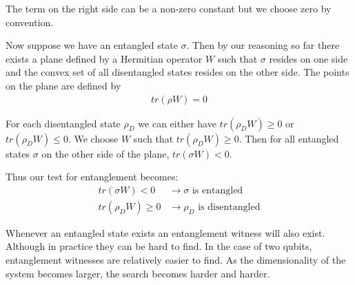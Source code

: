The term on the right side can be a non-zero constant but we choose zero by convention.
\par Now suppose we have an entangled state $\sigma$. Then by our reasoning so far there exists a plane defined by a Hermitian operator $W$ such that $\sigma$ resides on one side and the convex set of all disentangled states resides on the other side. The points on the plane are defined by
\begin{align*}
tr ( \rho W ) = 0
\end{align*}
\par For each disentangled state $\rho_D$ we can either have $tr (\rho_D W) \geq 0$ or $tr (\rho_D W) \leq 0$. We choose $W$ such that $tr (\rho_D W) \geq 0$. Then for all entangled states $\sigma$ on the other side of the plane, $tr (\sigma W) < 0$.
\par Thus our test for entanglement becomes:
\begin{align*}
  tr (\sigma W) < 0 &\rightarrow \sigma \text{ is entangled} \\
  tr (\rho_D W) \geq 0 &\rightarrow \rho_D \text{ is disentangled}
\end{align*}
\par Whenever an entangled state exists an entanglement witness will also exist. Although in practice they can be hard to find. In the case of two qubits, entanglement witnesses are relatively easier to find. As the dimensionality of the system becomes larger, the search becomes harder and harder. \cite{vedralqitbook}

